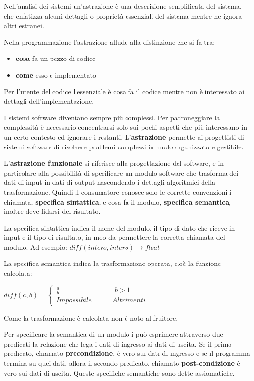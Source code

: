 \documentclass[a4paper,18pt]{extarticle}
\begin{document}
Nell'analisi dei sistemi un'astrazione è una descrizione semplificata del sistema, che enfatizza alcuni dettagli o proprietà essenziali del sistema mentre ne ignora altri estranei.

Nella programmazione l'astrazione allude alla distinzione che si fa tra:
\begin{itemize}
  \item \textbf{cosa} fa un pezzo di codice
  \item \textbf{come} esso è implementato
\end{itemize}
Per l'utente del codice l'essenziale è cosa fa il codice mentre non è interessato ai dettagli dell'implementazione.

I sistemi software diventano sempre più complessi. Per padroneggiare la complessità è necessario concentrarsi solo sui pochi aspetti che più interessano in un certo contesto ed ignorare i restanti. L'\textbf{astrazione} permette ai progettisti di sistemi software di risolvere problemi complessi in modo organizzato e gestibile.

L'\textbf{astrazione funzionale} si riferisce alla progettazione del software, e in particolare alla possibilità di specificare un modulo software che trasforma dei dati di input in dati di output nascondendo i dettagli algoritmici della trasformazione. Quindi il consumatore conosce solo le corrette convenzioni i chiamata, \textbf{specifica sintattica}, e cosa fa il modulo, \textbf{specifica semantica}, inoltre deve fidarsi del risultato.

La specifica sintattica indica il nome del modulo, il tipo di dato che riceve in input e il tipo di risultato, in moo da permettere la corretta chiamata del modulo. Ad esempio: $diff(intero, intero)\rightarrow float$

La specifica semantica indica la trasformazione operata, cioè la funzione calcolata:

$diff(a, b) = 
\begin{cases}  
\frac{a}{b} \quad\quad\quad\quad\quad\quad\quad\quad b>1\\
Impossibile   \quad \quad \quad Altrimenti

\end{cases}$

Come la trasformazione è calcolata non è noto al fruitore.


Per specificare la semantica di un modulo i può esprimere attraverso due predicati la relazione che lega i dati di ingresso ai dati di uscita. Se il primo predicato, chiamato \textbf{precondizione}, è vero sui dati di ingresso e se il programma termina su quei dati, allora il secondo predicato, chiamato \textbf{post-condizione} è vero sui dati di uscita. Queste specifiche semantiche sono dette assiomatiche.
\end{document}
